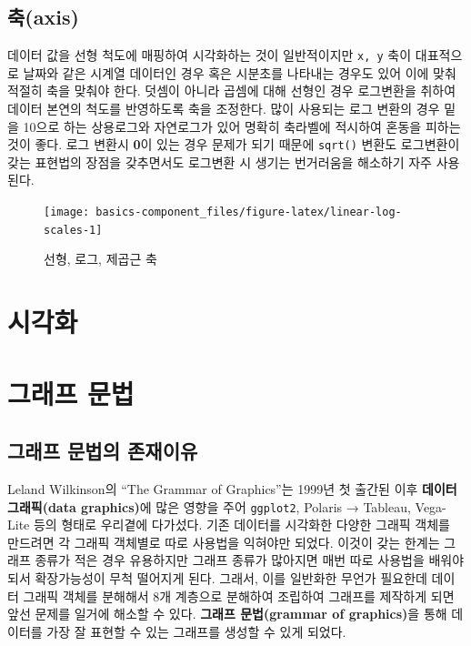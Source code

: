 \documentclass[
]{book}
\begin{document}
\hypertarget{coordinate}{%
\section{축(axis)}\label{coordinate}}

데이터 값을 선형 척도에 매핑하여 시각화하는 것이 일반적이지만 \texttt{x,\ y} 축이
대표적으로 날짜와 같은 시계열 데이터인 경우 혹은 시분초를 나타내는 경우도 있어 이에 맞춰
적절히 축을 맞춰야 한다. 덧셈이 아니라 곱셈에 대해 선형인 경우 로그변환을 취하여
데이터 본연의 척도를 반영하도록 축을 조정한다. 많이 사용되는 로그 변환의 경우
밑을 10으로 하는 상용로그와 자연로그가 있어 명확히 축라벨에 적시하여 혼동을 피하는 것이 좋다.
로그 변환시 \textbf{0}이 있는 경우 문제가 되기 때문에 \texttt{sqrt()} 변환도 로그변환이 갖는 표현법의 장점을
갖추면서도 로그변환 시 생기는 번거러움을 해소하기 자주 사용된다.

\begin{figure}

{\centering \texttt{[image: basics-component\_files/figure-latex/linear-log-scales-1]} 

}

\caption{선형, 로그, 제곱근 축}\label{fig:linear-log-scales}
\end{figure}

\hypertarget{uxc2dcuxac01uxd654}{%
\chapter*{시각화}\label{uxc2dcuxac01uxd654}}

\hypertarget{ggplot}{%
\chapter{그래프 문법}\label{ggplot}}

\hypertarget{why-ggplot2}{%
\section{그래프 문법의 존재이유}\label{why-ggplot2}}

Leland Wilkinson의 ``The Grammar of Graphics''는 1999년 첫 출간된 이후 \textbf{데이터 그래픽(data graphics)}에 많은 영향을 주어 \texttt{ggplot2}, Polaris → Tableau, Vega-Lite 등의 형태로 우리곁에 다가섰다.
기존 데이터를 시각화한 다양한 그래픽 객체를 만드려면 각 그래픽 객체별로 따로 사용법을 익혀야만 되었다.
이것이 갖는 한계는 그래프 종류가 적은 경우 유용하지만 그래프 종류가 많아지면 매번 따로 사용법을 배워야되서
확장가능성이 무척 떨어지게 된다.
그래서, 이를 일반화한 무언가 필요한데 데이터 그래픽 객체를 분해해서 8개 계층으로 분해하여 조립하여
그래프를 제작하게 되면 앞선 문제를 일거에 해소할 수 있다.
\textbf{그래프 문법(grammar of graphics)}을 통해 데이터를 가장 잘 표현할 수 있는 그래프를 생성할 수 있게 되었다.
\end{document}
